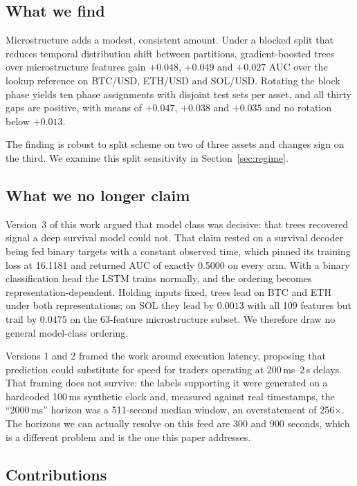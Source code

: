 \documentclass[11pt]{article}
\begin{document}
\subsection{What we find}

Microstructure adds a modest, consistent amount. Under a blocked split that
reduces temporal distribution shift between partitions, gradient-boosted trees
over
microstructure features gain $+0.048$, $+0.049$ and $+0.027$ AUC over the
lookup reference on BTC/USD, ETH/USD and SOL/USD. Rotating the block phase
yields ten phase assignments with disjoint test sets per asset, and all thirty
gaps are positive, with
means of $+0.047$, $+0.038$ and $+0.035$ and no rotation below $+0.013$.

The finding is robust to split scheme on two of three assets and changes sign
on the third. We examine this split sensitivity in
Section~\ref{sec:regime}.

\subsection{What we no longer claim}

Version~3 of this work argued that model class was decisive: that trees
recovered signal a deep survival model could not. That claim rested on a
survival decoder being fed binary targets with a constant observed time, which
pinned its training loss at 16.1181 and returned AUC of exactly 0.5000 on every
arm. With a binary classification head the LSTM trains normally, and the
ordering becomes representation-dependent. Holding inputs fixed, trees lead on
BTC and ETH under both representations; on SOL they lead by $0.0013$ with all
109 features but trail by $0.0475$ on the 63-feature microstructure subset. We
therefore draw no general model-class ordering.

Versions 1 and 2 framed the work around execution latency, proposing that
prediction could substitute for speed for traders operating at 200\,ms--2\,s
delays. That framing does not survive: the labels supporting it were generated
on a hardcoded 100\,ms synthetic clock and, measured against real timestamps,
the ``2000\,ms'' horizon was a 511-second median window, an overstatement of
256$\times$. The horizons we can actually resolve on this feed are 300 and 900
seconds, which is a different problem and is the one this paper addresses.

\subsection{Contributions}
\end{document}
